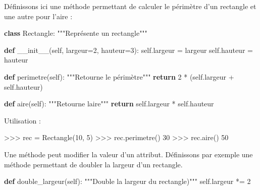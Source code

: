 \documentclass[
  french,
  letterpaper,
  DIV=11,
  numbers=noendperiod]{scrartcl}
\newenvironment{Shaded}{\begin{snugshade}}{\end{snugshade}}
\newcommand{\CommentTok}[1]{\textcolor[rgb]{0.37,0.37,0.37}{#1}}
\newcommand{\ControlFlowTok}[1]{\textcolor[rgb]{0.00,0.23,0.31}{\textbf{#1}}}
\newcommand{\DecValTok}[1]{\textcolor[rgb]{0.68,0.00,0.00}{#1}}
\newcommand{\FunctionTok}[1]{\textcolor[rgb]{0.28,0.35,0.67}{#1}}
\newcommand{\KeywordTok}[1]{\textcolor[rgb]{0.00,0.23,0.31}{\textbf{#1}}}
\newcommand{\NormalTok}[1]{\textcolor[rgb]{0.00,0.23,0.31}{#1}}
\newcommand{\OperatorTok}[1]{\textcolor[rgb]{0.37,0.37,0.37}{#1}}
\newcommand{\VariableTok}[1]{\textcolor[rgb]{0.07,0.07,0.07}{#1}}
\begin{document}
Définissons ici une méthode permettant de calculer le périmètre d'un
rectangle et une autre pour l'aire :

\begin{Shaded}
\begin{Highlighting}[]
\KeywordTok{class}\NormalTok{ Rectangle:}
    \CommentTok{"""Représente un rectangle"""}

    \KeywordTok{def} \FunctionTok{\_\_init\_\_}\NormalTok{(}\VariableTok{self}\NormalTok{, largeur}\OperatorTok{=}\DecValTok{2}\NormalTok{, hauteur}\OperatorTok{=}\DecValTok{3}\NormalTok{):}
        \VariableTok{self}\NormalTok{.largeur }\OperatorTok{=}\NormalTok{ largeur}
        \VariableTok{self}\NormalTok{.hauteur }\OperatorTok{=}\NormalTok{ hauteur}

    \KeywordTok{def}\NormalTok{ perimetre(}\VariableTok{self}\NormalTok{):}
        \CommentTok{"""Retourne le périmètre"""}
        \ControlFlowTok{return} \DecValTok{2} \OperatorTok{*}\NormalTok{ (}\VariableTok{self}\NormalTok{.largeur }\OperatorTok{+} \VariableTok{self}\NormalTok{.hauteur)}

    \KeywordTok{def}\NormalTok{ aire(}\VariableTok{self}\NormalTok{):}
        \CommentTok{"""Retourne l\textquotesingle{}aire"""}
        \ControlFlowTok{return} \VariableTok{self}\NormalTok{.largeur }\OperatorTok{*} \VariableTok{self}\NormalTok{.hauteur}
\end{Highlighting}
\end{Shaded}

Utilisation :

\begin{Shaded}
\begin{Highlighting}[]
\OperatorTok{\textgreater{}\textgreater{}\textgreater{}}\NormalTok{ rec }\OperatorTok{=}\NormalTok{ Rectangle(}\DecValTok{10}\NormalTok{, }\DecValTok{5}\NormalTok{)}
\OperatorTok{\textgreater{}\textgreater{}\textgreater{}}\NormalTok{ rec.perimetre()}
\DecValTok{30}
\OperatorTok{\textgreater{}\textgreater{}\textgreater{}}\NormalTok{ rec.aire()}
\DecValTok{50}
\end{Highlighting}
\end{Shaded}

Une méthode peut modifier la valeur d'un attribut. Définissons par
exemple une méthode permettant de doubler la largeur d'un rectangle.

\begin{Shaded}
\begin{Highlighting}[]
\KeywordTok{def}\NormalTok{ double\_largeur(}\VariableTok{self}\NormalTok{):}
    \CommentTok{"""Double la largeur du rectangle)"""}
    \VariableTok{self}\NormalTok{.largeur }\OperatorTok{*=} \DecValTok{2}
\end{Highlighting}
\end{Shaded}
\end{document}
